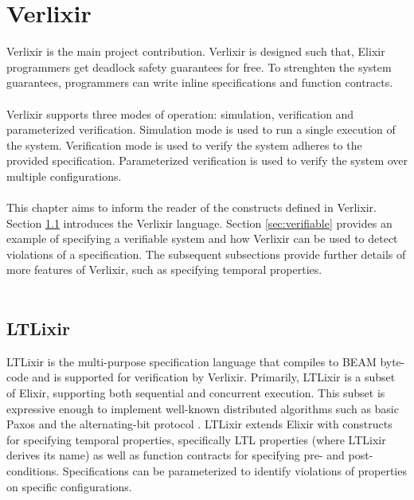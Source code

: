 \chapter{Verlixir} \label{chap:verlixir}
Verlixir is the main project contribution. Verlixir is designed such that, Elixir programmers get deadlock safety guarantees for free. To strenghten the system guarantees, programmers can write inline specifications and function contracts. 
\\ \\
Verlixir supports three modes of operation: simulation, verification and parameterized verification. Simulation mode is used to run a single execution of the system. Verification mode is used to verify the system adheres to the provided specification. Parameterized verification is used to verify the system over multiple configurations.
\\ \\
This chapter aims to inform the reader of the constructs defined in Verlixir. Section \ref{sec:ltlixir} introduces the Verlixir language. Section \ref{sec:verifiable} provides an example of specifying a verifiable system and how Verlixir can be used to detect violations of a specification. The subsequent subsections provide further details of more features of Verlixir, such as specifying temporal properties.
\\ \\
\section{LTLixir} \label{sec:ltlixir}
LTLixir is the multi-purpose specification language that compiles to BEAM byte-code and is supported for verification by Verlixir. Primarily, LTLixir is a subset of Elixir, supporting both sequential and concurrent execution. This subset is expressive enough to implement well-known distributed algorithms such as basic Paxos \cite{basic_paxos} and the alternating-bit protocol \cite{ab_protocol}. LTLixir extends Elixir with constructs for specifying temporal properties, specifically LTL properties (where LTLixir derives its name) as well as function contracts for specifying pre- and post-conditions. Specifications can be parameterized to identify violations of properties on specific configurations. 
\\ \\
